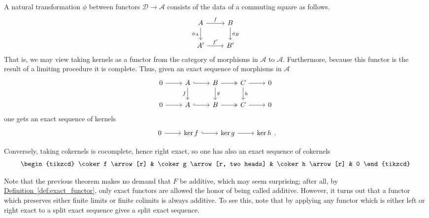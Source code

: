\documentclass[main.tex]{subfiles}
\begin{document}
\begin{example}
  A natural transformation $\phi$ between functors $\mathcal{D} \to \mathcal{A}$ consists of the data of a commuting square as follows.
  \begin{equation*}
    \begin{tikzcd}
      A
      \arrow[r, "f"]
      \arrow[d, swap, "\phi_{A}"]
      & B
      \arrow[d, "\phi_{B}"]
      \\
      A'
      \arrow[r, "f'"]
      & B'
    \end{tikzcd}
  \end{equation*}
  That is, we may view taking kernels as a functor from the category of morphisms in $\mathcal{A}$ to $\mathcal{A}$. Furthermore, because this functor is the result of a limiting procedure it is complete. Thus, given an exact sequence of morphisms in $\mathcal{A}$
  \begin{equation*}
    \begin{tikzcd}
      0
      \arrow[r]
      & A
      \arrow[r, hook]
      \arrow[d, swap, "f"]
      & B
      \arrow[r, two heads]
      \arrow[d, "g"]
      & C
      \arrow[r]
      \arrow[d, "h"]
      & 0
      \\
      0
      \arrow[r]
      & A
      \arrow[r, hook]
      & B
      \arrow[r, two heads]
      & C
      \arrow[r]
      & 0
    \end{tikzcd}
  \end{equation*}
  one gets an exact sequence of kernels
  \begin{equation*}
    \begin{tikzcd}
      0
      \arrow[r]
      & \ker f
      \arrow[r, hook]
      & \ker g
      \arrow[r]
      & \ker h
    \end{tikzcd}.
  \end{equation*}

  Conversely, taking cokernels is cocomplete, hence right exact, so one has also an exact sequence of cokernels
  \begin{equation*}
    \begin{tikzcd}
      \coker f
      \arrow[r]
      & \coker g
      \arrow[r, two heads]
      & \coker h
      \arrow[r]
      & 0
    \end{tikzcd}
  \end{equation*}
\end{example}

Note that the previous theorem makes no demand that $F$ be additive, which may seem surprising; after all, by  \hyperref[def:exact_functor]{Definition~\ref*{def:exact_functor}}, only exact functors are allowed the honor of being called additive. However, it turns out that a functor which preserves either finite limits or finite colimits is always additive. To see this, note that by applying any functor which is either left or right exact to a split exact sequence gives a split exact sequence.
\end{document}
